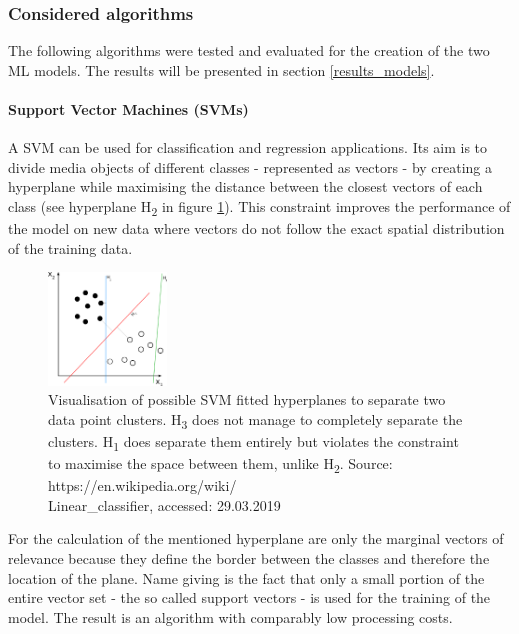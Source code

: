 \subsubsection{Considered algorithms} \label{ml_algorithms}
The following algorithms were tested and evaluated for the creation of the two ML models. The results will be presented in section \ref{results_models}.

\paragraph*{Support Vector Machines (SVMs)}
A SVM can be used for classification and regression applications. Its aim is to divide media objects of different classes - represented as vectors - by creating a hyperplane while maximising the distance between the closest vectors of each class (see hyperplane H\textsubscript{2} in figure \ref{fig:SVM_visualisation}). This constraint improves the performance of the model on new data where vectors do not follow the exact spatial distribution of the training data.

\begin{figure} %
    \centerline{\includegraphics[trim={0 0 0 0},clip,width=0.28\textwidth]{img/Svm_separating_hyperplanes}}
  \caption{Visualisation of possible SVM fitted hyperplanes to separate two data point clusters. H\textsubscript{3} does not manage to completely separate the clusters. H\textsubscript{1} does separate them entirely but violates the constraint to maximise the space between them, unlike H\textsubscript{2}. Source: https://en.wikipedia.org/wiki/ \\ Linear\_classifier, accessed: 29.03.2019}
  \label{fig:SVM_visualisation}
\vspace{-0.5cm}
\end{figure}

For the calculation of the mentioned hyperplane are only the marginal vectors of relevance because they define the border between the classes and therefore the location of the plane. Name giving is the fact that only a small portion of the entire vector set - the so called support vectors - is used for the training of the model. The result is an algorithm with comparably low processing costs.

